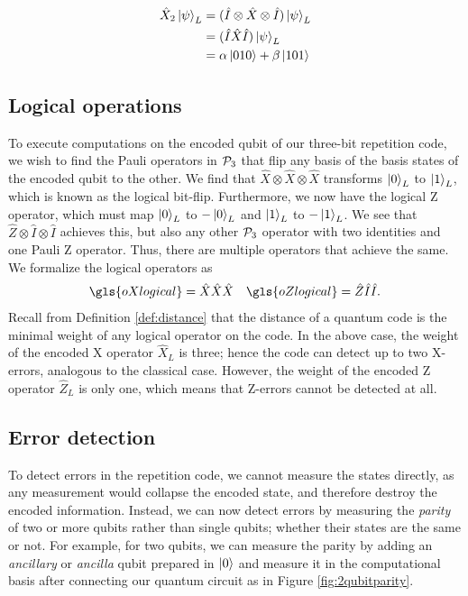 \begin{align}
  \nonumber \hat{X}_2\ket{\psi}_L 
  \nonumber&= (\hat{I}\otimes \hat{X} \otimes \hat{I}) \ket{\psi}_L \\
  \nonumber&= (\hat{I} \hat{X} \hat{I}) \ket{\psi}_L\\
  &= \alpha\ket{010} + \beta\ket{101} \label{eq:qec_3bitflip}
\end{align}

\subsection{Logical operations}
To execute computations on the encoded qubit of our three-bit repetition code, we wish to find the Pauli operators in $\mathcal{P}_3$ that flip any basis of the basis states of the encoded qubit to the other. We find that $\hat{X}\otimes \hat{X}\otimes \hat{X}$ transforms $\ket{0}_L$ to $\ket{1}_L$, which is known as the logical bit-flip. Furthermore, we now have the logical Z operator, which must map $\ket{0}_L$ to $-\ket{0}_L$ and $\ket{1}_L$ to $-\ket{1}_L$. We see that $\hat{Z}\otimes \hat{I}\otimes \hat{I}$ achieves this, but also any other $\mathcal{P}_3$ operator with two identities and one Pauli Z operator. Thus, there are multiple operators that achieve the same. We formalize the logical operators as
\begin{align}\label{eq:qec_3bitlogical}
  \gls{oXlogical} = \hat{X}\hat{X}\hat{X} && \gls{oZlogical} = \hat{Z}\hat{I}\hat{I}.
\end{align}
Recall from Definition \ref{def:distance} that the distance of a quantum code is the minimal weight of any logical operator on the code. In the above case, the weight of the encoded X operator $\hat{X}_L$ is three; hence the code can detect up to two X-errors, analogous to the classical case. However, the weight of the encoded Z operator $\hat{Z}_L$ is only one, which means that Z-errors cannot be detected at all.

\subsection{Error detection}
To detect errors in the repetition code, we cannot measure the states directly, as any measurement would collapse the encoded state, and therefore destroy the encoded information. Instead, we can now detect errors by measuring the \emph{parity} of two or more qubits rather than single qubits; whether their states are the same or not. For example, for two qubits, we can measure the parity by adding an \emph{ancillary} or \emph{ancilla} qubit prepared in $\ket{0}$ and measure it in the computational basis after connecting our quantum circuit as in Figure \ref{fig:2qubitparity}. 

